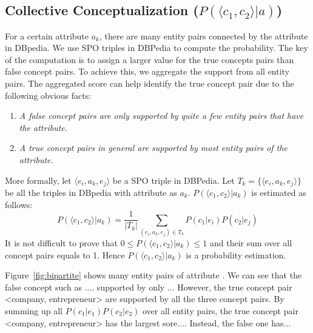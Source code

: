 \subsection{Collective Conceptualization ($P( \langle c_{1},c_{2} \rangle |a)$) }
For a certain attribute $a_k$, there are many entity pairs connected by the attribute in DBpedia.
We use SPO triples in DBPedia to compute the probability.
The key of the computation is to assign a larger value for the true concepts pairs than false concept pairs.
To achieve this, we aggregate the support from all entity pairs.
The aggregated score can help identify the true concept pair due to the following
obvious facts:
\begin{enumerate}
\item \emph{A false concept pairs are only supported by quite a few
entity pairs that have the attribute.}
\item \emph{A true concept pairs in general are supported by most entity pairs of the attribute.}
\end{enumerate}

More formally, let $ \langle e_i, a_k, e_j \rangle $ be a SPO triple in DBPedia.
Let $T_k=\{\langle e_i, a_k, e_j \rangle\}$ be all the triples in DBpedia with attribute as $a_k$.
$P( \langle c_1, c_2 \rangle |a_k)$ is estimated as follows:
\begin{equation}
P(\langle c_1, c_2\rangle|a_k)= \frac{1}{|T_k|}\sum_{  (e_{i},a_k,e_{j})\in T_k } P(c_1|e_{i})P(c_2|e_{j})
\label{eq:pccga}
\end{equation}
It is not difficult to prove that $0\leq P( \langle c_1, c_2 \rangle |a_k)\leq 1$ and their sum over all concept pairs equals to 1.
Hence $P( \langle c_1, c_2 \rangle |a_k)$ is a probability estimation.

\begin{example}
\label{exa:pggga}
Figure~\ref{fig:bipartite} shows many entity pairs of attribute . We can see that
the false concept such as .... supported by only ... However, the true concept pair \ac{<company, entrepreneur>}
are supported by all the three concept pairs. By summing up all $P(c_1|e_1)P(c_2|e_2) $ over all entity pairs, the true concept pair \ac{<company, entrepreneur>} has the largest sore.... Instead, the false one has...
\end{example}


